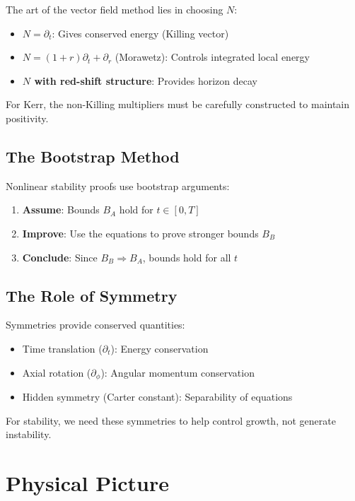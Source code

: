 \documentclass[12pt,a4paper]{article}
\begin{document}
The art of the vector field method lies in choosing $N$:
\begin{itemize}
    \item \textbf{$N = \partial_t$}: Gives conserved energy (Killing vector)
    \item \textbf{$N = (1+r)\partial_t + \partial_r$} (Morawetz): Controls integrated local energy
    \item \textbf{$N$ with red-shift structure}: Provides horizon decay
\end{itemize}

For Kerr, the non-Killing multipliers must be carefully constructed to maintain positivity.

\subsection{The Bootstrap Method}

Nonlinear stability proofs use bootstrap arguments:

\begin{enumerate}
    \item \textbf{Assume}: Bounds $B_A$ hold for $t \in [0, T]$
    \item \textbf{Improve}: Use the equations to prove stronger bounds $B_B$
    \item \textbf{Conclude}: Since $B_B \Rightarrow B_A$, bounds hold for all $t$
\end{enumerate}

\subsection{The Role of Symmetry}

Symmetries provide conserved quantities:
\begin{itemize}
    \item Time translation ($\partial_t$): Energy conservation
    \item Axial rotation ($\partial_\phi$): Angular momentum conservation
    \item Hidden symmetry (Carter constant): Separability of equations
\end{itemize}

For stability, we need these symmetries to help control growth, not generate instability.

\section{Physical Picture}
\end{document}
